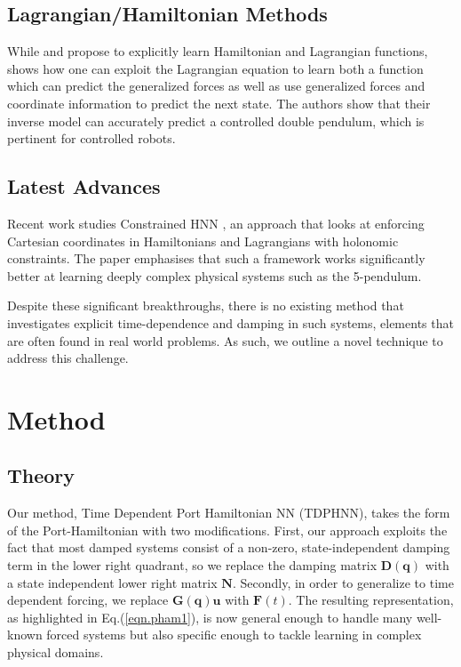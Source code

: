 \documentclass{article}
\begin{document}
\subsection*{Lagrangian/Hamiltonian Methods}
While \cite{cranmer_lagrangian_2020} and \cite{greydanus_hamiltonian_2019} propose to explicitly learn Hamiltonian and Lagrangian functions, \cite{lutter_deep_2019} shows how one can exploit the Lagrangian equation to learn both a function which can predict the generalized forces as well as use generalized forces and coordinate information to predict the next state. The authors show that their inverse model can accurately predict a controlled double pendulum, which is pertinent for controlled robots.

\subsection*{Latest Advances}
Recent work studies Constrained HNN \cite{finzi_generalizing_2020}, an approach that looks at enforcing Cartesian coordinates in Hamiltonians and Lagrangians with holonomic constraints. The paper emphasises that such a framework works significantly better at learning deeply complex physical systems such as the 5-pendulum. 

Despite these significant breakthroughs, there is no existing method that investigates explicit time-dependence and damping in such systems, elements that are often found in real world problems. As such, we outline a novel technique to address this challenge.

\section{Method}

\subsection{Theory}
Our method, Time Dependent Port Hamiltonian NN (TDPHNN), takes the form of the Port-Hamiltonian with two modifications. First, our approach exploits the fact that most damped systems consist of a non-zero, state-independent damping term in the lower right quadrant, so we replace the damping matrix $\mathbf{D}(\mathbf{q})$ with a state independent lower right matrix $\mathbf{N}$. Secondly, in order to generalize to time dependent forcing, we replace $\mathbf{G}(\mathbf{q})\mathbf{u}$ with $\mathbf{F}(t)$. The resulting representation, as highlighted in Eq.(\ref{eqn.pham1}), is now general enough to handle many well-known forced systems but also specific enough to tackle learning in complex physical domains.
\end{document}
